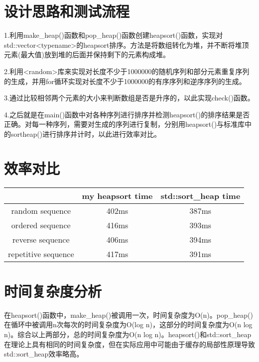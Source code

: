\documentclass[UTF8]{ctexart}
\begin{document}
\pagestyle{fancy}
\fancyhead{}

\section{设计思路和测试流程}

1.利用make\_heap()函数和pop\_heap()函数创建heapsort()函数，实现对std::vector<typename>的heapsort排序。方法是将数组转化为堆，并不断将堆顶元素(最大值)放到堆的后面并保持剩下的元素构成堆。

2.利用<random>库来实现对长度不少于1000000的随机序列和部分元素重复序列的生成，并用for循环实现对长度不少于1000000的有序序列和逆序序列的生成。

3.通过比较相邻两个元素的大小来判断数组是否是升序的，以此实现check()函数。

4.之后就是在main()函数中对各种序列进行排序并检测heapsort()的排序结果是否正确。对每一种序列，需要对生成的序列进行复制，分别用heapsort()与标准库中的sortheap()进行排序并计时，以此进行效率对比。

\section{效率对比}

\begin{center}
\begin{tabular}{|c|c|c|}
	\hline
	  &  my heapsort time  &  std::sort\_heap time \\ \hline
	random sequence  &  402ms  &  387ms \\ \hline
	ordered sequence  &  416ms  &  393ms \\ \hline
	reverse sequence  &  406ms  &  394ms \\ \hline
	repetitive sequence  &  417ms  &  391ms \\ \hline
\end{tabular}
\end{center}

\section{时间复杂度分析}

在heapsort()函数中，make\_heap()被调用一次，时间复杂度为O(n)。pop\_heap()在循环中被调用n次每次的时间复杂度为O(log n)，这部分的时间复杂度为O(n log n)。综合以上两部分，总的时间复杂度为O(n log n)。heapsort()和std::sort\_heap在理论上具有相同的时间复杂度，但在实际应用中可能由于缓存的局部性原理导致std::sort\_heap效率略高。
\end{document}
